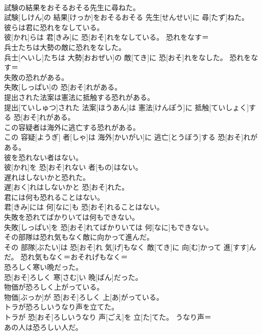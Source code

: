 \documentclass[8pt]{extreport}
\begin{document}
\begin{CJK}{UTF8}{min}
{\\	試験の結果をおそるおそる先生に尋ねた。	
\\	試験[しけん]の 結果[けっか]をおそるおそる 先生[せんせい]に 尋[たず]ねた。	
\\	彼らは君に恐れをなしている。	
\\	彼[かれ]らは 君[きみ]に 恐[おそ]れをなしている。	恐れをなす＝ 
\\	兵士たちは大勢の敵に恐れをなした。	
\\	兵士[へいし]たちは 大勢[おおぜい]の 敵[てき]に 恐[おそ]れをなした。	恐れをなす＝ 
\\	失敗の恐れがある。	
\\	失敗[しっぱい]の 恐[おそ]れがある。	
\\	提出された法案は憲法に抵触する恐れがある。	
\\	提出[ていしゅつ]された 法案[ほうあん]は 憲法[けんぽう]に 抵触[ていしょく]する 恐[おそ]れがある。	
\\	この容疑者は海外に逃亡する恐れがある。	
\\	この 容疑[ようぎ] 者[しゃ]は 海外[かいがい]に 逃亡[とうぼう]する 恐[おそ]れがある。	
\\	彼を恐れない者はない。	
\\	彼[かれ]を 恐[おそ]れない 者[もの]はない。	
\\	遅れはしないかと恐れた。	
\\	遅[おく]れはしないかと 恐[おそ]れた。	
\\	君には何も恐れることはない。	
\\	君[きみ]には 何[なに]も 恐[おそ]れることはない。	
\\	失敗を恐れてばかりいては何もできない。	
\\	失敗[しっぱい]を 恐[おそ]れてばかりいては 何[なに]もできない。	
\\	その部隊は恐れ気もなく敵に向かって進んだ。	
\\	その 部隊[ぶたい]は 恐[おそ]れ 気[げ]もなく 敵[てき]に 向[む]かって 進[すす]んだ。	恐れ気もなく＝おそれげもなく＝ 
\\	恐ろしく寒い晩だった。	
\\	恐[おそ]ろしく 寒[さむ]い 晩[ばん]だった。	
\\	物価が恐ろしく上がっている。	
\\	物価[ぶっか]が 恐[おそ]ろしく 上[あ]がっている。	
\\	トラが恐ろしいうなり声を立てた。	
\\	トラが 恐[おそ]ろしいうなり 声[ごえ]を 立[た]てた。	うなり声＝ 
\\	あの人は恐ろしい人だ。	
}
\end{CJK}
\end{document}

